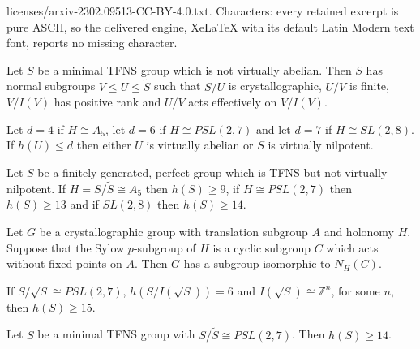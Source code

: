 \documentclass[10pt,a4paper]{amsart}
\renewcommand{\geq}{\geqslant}
\renewcommand{\leq}{\leqslant}
\begin{document}
licenses/arxiv-2302.09513-CC-BY-4.0.txt. Characters: every retained excerpt is pure ASCII, so the delivered engine, XeLaTeX with its default Latin Modern text font, reports no missing character.
\begin{lemma}
\label{overline}
Let $S$ be a minimal TFNS group which is not virtually abelian.
Then $S$ has normal subgroups $V\leq{U}\leq\widetilde{S}$ such that
$S/U$ is crystallographic,  $U/V$ is finite, $V/I(V)$ has positive rank
and $U/V$ acts effectively on $V/I(V)$.
\end{lemma}

\begin{lemma}
\label{gl(10,Q)}
Let $d=4$ if $H\cong{A_5}$, 
let $d=6$ if $H\cong{PSL(2,7)}$ and let $d=7$ if $H\cong{SL(2,8)}$.
If $h(U)\leq{d}$ then either $U$ is virtually abelian or $S$ is virtually nilpotent.
\end{lemma}

\begin{theorem}
\label{vsolvthm}
Let $S$ be a finitely generated, perfect group which is TFNS but not virtually nilpotent.
If $H=S/\widetilde{S}\cong{A_5}$ then $h(S)\geq9$,
if $H\cong{PSL(2,7)}$
then $h(S)\geq13$ and if $SL(2,8)$ then $h(S)\geq14$.
\end{theorem}

\begin{lemma}
\label{split normal}
Let $G$ be a crystallographic group with translation subgroup $A$ and holonomy $H$.
Suppose that the Sylow $p$-subgroup of $H$ is a cyclic subgroup $C$ which 
acts without fixed points on $A$.
Then $G$ has a subgroup isomorphic to $N_H(C)$.
\end{lemma}

\begin{theorem}
\label{no7}
If $S/\sqrt{S}\cong{PSL(2,7)}$,
$h(S/I(\sqrt{S}))=6$ and $I(\sqrt{S})\cong\mathbb{Z}^n$, for some $n$,
then $h(S)\geq15$.
\end{theorem}

\begin{theorem}
\label{vmetabPSL(2,7)}
Let $S$ be a minimal TFNS group with $S/\widetilde{S}\cong{PSL(2,7)}$.
Then $h(S)\geq14$.
\end{theorem}
\end{document}
